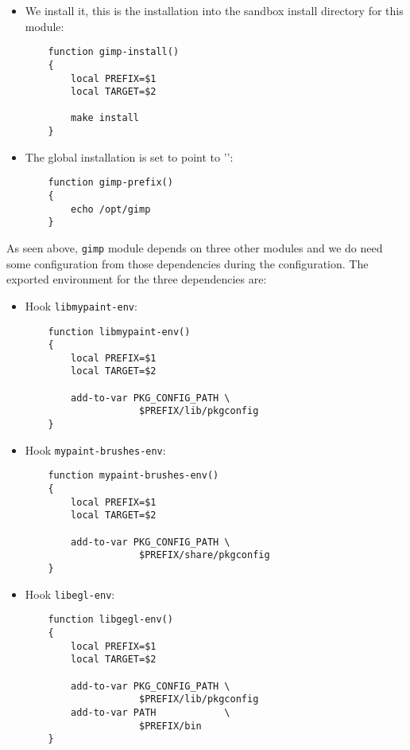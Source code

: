\documentclass[a4paper,12pt,twoside]{article}
\newcommand{\code}[1]{\texttt{#1}}
\newcommand{\file}[1]{'{\path{#1}}'}
\begin{document}
\begin{itemize}
	\item We install it, this is the installation into the sandbox install directory for this module:

	\begin{lstlisting}
	function gimp-install()
	{
		local PREFIX=$1
		local TARGET=$2

		make install
	}
	\end{lstlisting}

	\item The global installation is set to point to \file{/opt/gimp}:

	\begin{lstlisting}
	function gimp-prefix()
	{
		echo /opt/gimp
	}
	\end{lstlisting}

\end{itemize}

As seen above, \code{gimp} module depends on three other modules and we do need some configuration from those dependencies during the configuration. The exported environment for the three dependencies are:

\begin{itemize}
	\item Hook \code{libmypaint-env}:

	\begin{lstlisting}
	function libmypaint-env()
	{
		local PREFIX=$1
		local TARGET=$2

		add-to-var PKG_CONFIG_PATH \
					$PREFIX/lib/pkgconfig
	}
	\end{lstlisting}

	\item Hook \code{mypaint-brushes-env}:

	\begin{lstlisting}
	function mypaint-brushes-env()
	{
		local PREFIX=$1
		local TARGET=$2

		add-to-var PKG_CONFIG_PATH \
					$PREFIX/share/pkgconfig
	}
	\end{lstlisting}

	\item Hook \code{libegl-env}:

	\begin{lstlisting}
	function libgegl-env()
	{
		local PREFIX=$1
		local TARGET=$2

		add-to-var PKG_CONFIG_PATH \
					$PREFIX/lib/pkgconfig
		add-to-var PATH            \
					$PREFIX/bin
	}
	\end{lstlisting}

\end{itemize}
\end{document}
